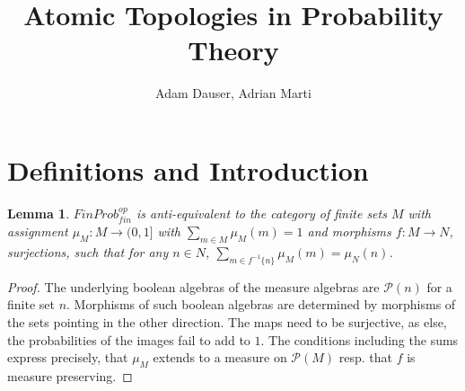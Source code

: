 \documentclass[a4paper,draft]{amsproc}
\title{\textbf{Atomic Topologies in Probability Theory}}
\author{Adam Dauser, Adrian Marti} %
\date{}
\theoremstyle{plain}
\newtheorem{lemma}{Lemma}[section]
\theoremstyle{definition}
\theoremstyle{remark}
\numberwithin{equation}{section}
\begin{document}
\maketitle 
\section{Definitions and Introduction}
\begin{lemma}\label{dumbeq}$FinProb^{op}_{fin}$ is anti-equivalent to the category of finite sets $M$ with assignment $\mu_M: M\rightarrow (0,1]$ with $\sum_{m\in M}\mu_M(m)=1$ and morphisms $f:M\rightarrow N$, surjections, such that for any $n\in N$, $\sum_{m\in f^{-1}\{n \}}\mu_M (m)=\mu_N(n)$.
\end{lemma}
\begin{proof} The underlying boolean algebras of the measure algebras are $\mathcal{P}(n)$ for a finite set $n$. Morphisms of such boolean algebras are determined by morphisms of the sets pointing in the other direction. The maps need to be surjective, as else, the probabilities of the images fail to add to  $1$. The conditions including the sums express precisely, that $\mu_M$ extends to a measure on $\mathcal{P}(M)$ resp. that $f$ is measure preserving.
\end{proof}
\end{document}
